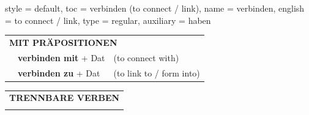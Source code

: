 \begin{verbentry}{
  style = {default},
  toc = {verbinden (to connect / link)},
  name = {verbinden},
  english = {to connect / link},
  type = {regular},
  auxiliary = {haben}
}
\vspace{10pt}

\begin{tabular}{lll}
\multicolumn{3}{l}{\textbf{MIT PRÄPOSITIONEN}}\\
& \textbf{verbinden mit} + Dat & (to connect with)\\
& \textbf{verbinden zu} + Dat & (to link to / form into)\\
\end{tabular}
\hfill
\begin{tabular}{lll}
\multicolumn{3}{l}{\textbf{TRENNBARE VERBEN}}\\
\vspace{20pt}
\end{tabular}
\vspace{-5pt}
\end{verbentry}

